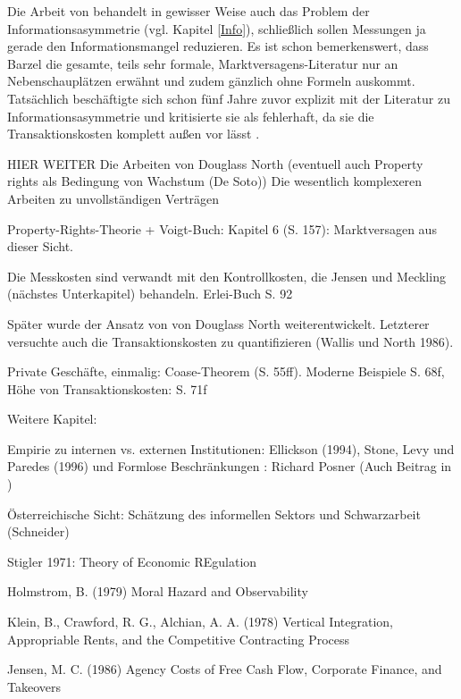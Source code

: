 Die Arbeit von \Textcite{Barzel1982} behandelt in gewisser Weise auch das Problem der Informationsasymmetrie (vgl. Kapitel \ref{Info}), schließlich sollen Messungen ja gerade den Informationsmangel reduzieren. Es ist schon bemerkenswert, dass Barzel die gesamte, teils sehr formale, Marktversagens-Literatur nur an Nebenschauplätzen erwähnt und zudem gänzlich ohne Formeln auskommt. Tatsächlich beschäftigte sich \textcite{Barzel1977} schon fünf Jahre zuvor explizit mit der Literatur zu Informationsasymmetrie und kritisierte sie als fehlerhaft, da sie die Transaktionskosten komplett außen vor lässt \parencite[S. 6]{Allen2024}. 


HIER WEITER
Die Arbeiten von Douglass North (eventuell auch Property rights als Bedingung von Wachstum (De Soto))
Die wesentlich komplexeren Arbeiten zu unvollständigen Verträgen




\parencite[S. 284]{Erlei2016}
Property-Rights-Theorie + Voigt-Buch: Kapitel 6 (S. 157): Marktversagen aus dieser Sicht.




Die Messkosten sind verwandt mit den Kontrollkosten, die Jensen und Meckling (nächstes Unterkapitel) behandeln.
Erlei-Buch S. 92

Später wurde der Ansatz von von Douglass North weiterentwickelt. Letzterer versuchte auch die Transaktionskosten zu quantifizieren (Wallis und North 1986).






Private Geschäfte, einmalig: Coase-Theorem (S. 55ff). Moderne Beispiele S. 68f, Höhe von Transaktionskosten: S. 71f


Weitere Kapitel: 

Empirie zu internen vs. externen Institutionen: Ellickson (1994), Stone, Levy und Paredes (1996) und Formlose Beschränkungen \parencite[S. 43]{North1990}: Richard Posner (Auch Beitrag in \textcite{Warsh})

Österreichische Sicht: Schätzung des informellen Sektors und Schwarzarbeit (Schneider)

Stigler 1971: Theory of Economic REgulation

Holmstrom, B. (1979) Moral Hazard and Observability




Klein, B., Crawford, R. G., Alchian, A. A. (1978) Vertical Integration, Appropriable Rents, and the Competitive Contracting Process

Jensen, M. C. (1986) Agency Costs of Free Cash Flow, Corporate Finance, and Takeovers


